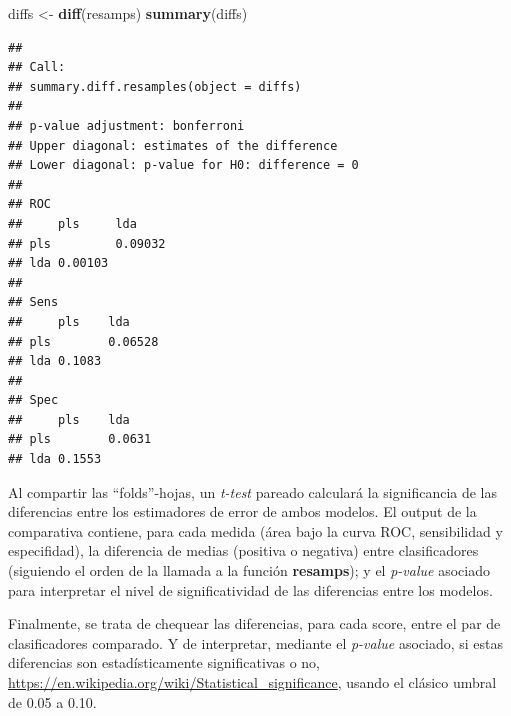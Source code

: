 \documentclass[
]{article}
\newenvironment{Shaded}{\begin{snugshade}}{\end{snugshade}}
\newcommand{\KeywordTok}[1]{\textcolor[rgb]{0.13,0.29,0.53}{\textbf{#1}}}
\newcommand{\NormalTok}[1]{#1}
\newcommand{\StringTok}[1]{\textcolor[rgb]{0.31,0.60,0.02}{#1}}
\begin{document}
\begin{Shaded}
\begin{Highlighting}[]
\NormalTok{diffs <-}\StringTok{ }\KeywordTok{diff}\NormalTok{(resamps)}
\KeywordTok{summary}\NormalTok{(diffs)}
\end{Highlighting}
\end{Shaded}

\begin{verbatim}
## 
## Call:
## summary.diff.resamples(object = diffs)
## 
## p-value adjustment: bonferroni 
## Upper diagonal: estimates of the difference
## Lower diagonal: p-value for H0: difference = 0
## 
## ROC 
##     pls     lda    
## pls         0.09032
## lda 0.00103        
## 
## Sens 
##     pls    lda    
## pls        0.06528
## lda 0.1083        
## 
## Spec 
##     pls    lda   
## pls        0.0631
## lda 0.1553
\end{verbatim}

Al compartir las ``folds''-hojas, un \emph{t-test} pareado calculará la
significancia de las diferencias entre los estimadores de error de ambos
modelos. El output de la comparativa contiene, para cada medida (área
bajo la curva ROC, sensibilidad y especifidad), la diferencia de medias
(positiva o negativa) entre clasificadores (siguiendo el orden de la
llamada a la función \textbf{resamps}); y el \emph{p-value} asociado
para interpretar el nivel de significatividad de las diferencias entre
los modelos.

Finalmente, se trata de chequear las diferencias, para cada score, entre
el par de clasificadores comparado. Y de interpretar, mediante el
\emph{p-value} asociado, si estas diferencias son estadísticamente
significativas o no,
\url{https://en.wikipedia.org/wiki/Statistical_significance}, usando el
clásico umbral de 0.05 a 0.10.
\end{document}
